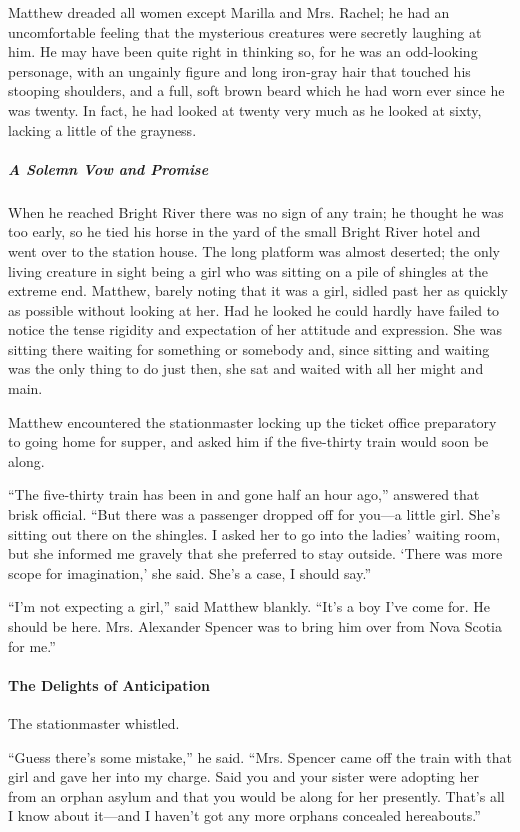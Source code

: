 \documentclass{article}
\begin{document}
Matthew dreaded all women except Marilla and Mrs. Rachel; he had an uncomfortable feeling that the mysterious creatures were secretly laughing at him. He may have been quite right in thinking so, for he was an odd-looking personage, with an ungainly figure and long iron-gray hair that touched his stooping shoulders, and a full, soft brown beard which he had worn ever since he was twenty. In fact, he had looked at twenty very much as he looked at sixty, lacking a little of the grayness.

\subparagraph{A Solemn Vow and Promise}
When he reached Bright River there was no sign of any train; he thought he was too early, so he tied his horse in the yard of the small Bright River hotel and went over to the station house. The long platform was almost deserted; the only living creature in sight being a girl who was sitting on a pile of shingles at the extreme end. Matthew, barely noting that it was a girl, sidled past her as quickly as possible without looking at her. Had he looked he could hardly have failed to notice the tense rigidity and expectation of her attitude and expression. She was sitting there waiting for something or somebody and, since sitting and waiting was the only thing to do just then, she sat and waited with all her might and main.

Matthew encountered the stationmaster locking up the ticket office preparatory to going home for supper, and asked him if the five-thirty train would soon be along.

``The five-thirty train has been in and gone half an hour ago,'' answered that brisk official. ``But there was a passenger dropped off for you---a little girl. She's sitting out there on the shingles. I asked her to go into the ladies' waiting room, but she informed me gravely that she preferred to stay outside. `There was more scope for imagination,' she said. She's a case, I should say.''

``I'm not expecting a girl,'' said Matthew blankly. ``It's a boy I've come for. He should be here. Mrs. Alexander Spencer was to bring him over from Nova Scotia for me.''

\paragraph{The Delights of Anticipation}
The stationmaster whistled.

``Guess there's some mistake,'' he said. ``Mrs. Spencer came off the train with that girl and gave her into my charge. Said you and your sister were adopting her from an orphan asylum and that you would be along for her presently. That's all I know about it---and I haven't got any more orphans concealed hereabouts.''
\end{document}
